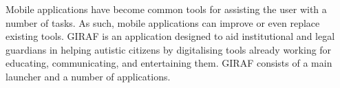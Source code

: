 
Mobile applications have become common tools for assisting the user with a number of tasks. As such, mobile applications can improve or even replace existing tools. GIRAF is an application designed to aid institutional and legal guardians in helping autistic citizens by digitalising tools already working for educating, communicating, and entertaining them. GIRAF consists of a main launcher and a number of applications. 